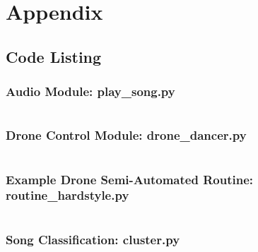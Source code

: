 \newpage
\onecolumn
\section{Appendix}
\subsection{Code Listing}
\subsubsection{Audio Module: play\_song.py}
\inputminted[fontsize=\footnotesize,linenos]{python}{../code/play_song.py}

\newpage
\subsubsection{Drone Control Module: drone\_dancer.py}
\inputminted[fontsize=\footnotesize,linenos]{python}{../code/PS-drone/drone_dancer.py}

\newpage
\subsubsection{Example Drone Semi-Automated Routine: routine\_hardstyle.py}
\inputminted[fontsize=\footnotesize,linenos]{python}{../code/PS-drone/routine_hardstyle.py}

\newpage
\subsubsection{Song Classification: cluster.py}
\inputminted[fontsize=\footnotesize,linenos]{python}{../code/classification/cluster.py}
